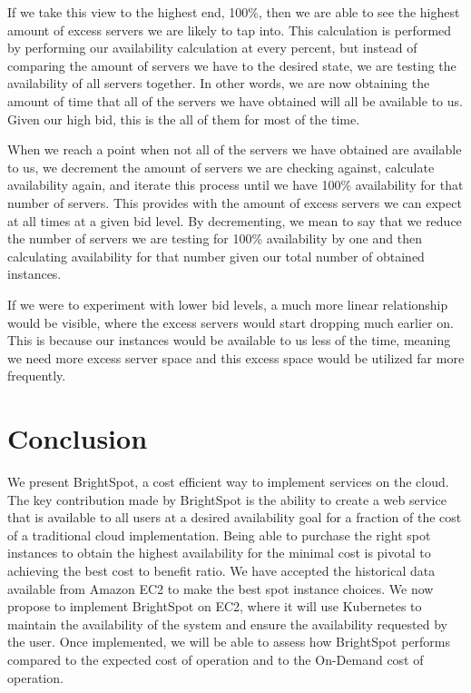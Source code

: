 \documentclass[thesis,proposal]{umassthesis}  %
\begin{document}
If we take this view to the highest end, 100\%, then we are able to see the highest amount of excess servers we are likely to tap into. This calculation is performed by performing our availability calculation at every percent, but instead of comparing the amount of servers we have to the desired state, we are testing the availability of all servers together. In other words, we are now obtaining the amount of time that all of the servers we have obtained will all be available to us. Given our high bid, this is the all of them for most of the time.

When we reach a point when not all of the servers we have obtained are available to us, we decrement the amount of servers we are checking against, calculate availability again, and iterate this process until we have 100\% availability for that number of servers. This provides with the amount of excess servers we can expect at all times at a given bid level. By decrementing, we mean to say that we reduce the number of servers we are testing for 100\% availability by one and then calculating availability for that number given our total number of obtained instances.

If we were to experiment with lower bid levels, a much more linear relationship would be visible, where the excess servers would start dropping much earlier on. This is because our instances would be available to us less of the time, meaning we need more excess server space and this excess space would be utilized far more frequently.




\chapter{Conclusion}

We present BrightSpot, a cost efficient way to implement services on the cloud. The key contribution made by BrightSpot is the ability to create a web service that is available to all users at a desired availability goal for a fraction of the cost of a traditional cloud implementation. Being able to purchase the right spot instances to obtain the highest availability for the minimal cost is pivotal to achieving the best cost to benefit ratio. We have accepted the historical data available from Amazon EC2 to make the best spot instance choices. We now propose to implement BrightSpot on EC2, where it will use Kubernetes to maintain the availability of the system and ensure the availability requested by the user. Once implemented, we will be able to assess how BrightSpot performs compared to the expected cost of operation and to the On-Demand cost of operation. 
\end{document}
